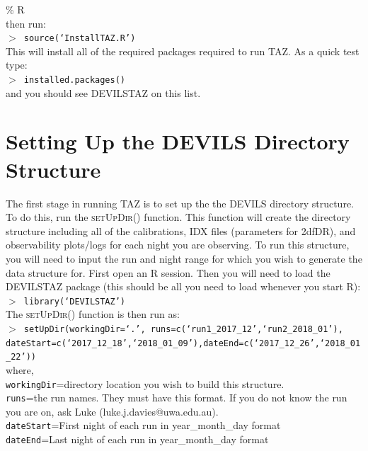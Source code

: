 \documentclass[12pt]{article}
\begin{document}
\hspace{10mm} \% R\\

then run:\\

\hspace{10mm}  \texttt{$>$ source(`InstallTAZ.R')}\\

This will install all of the required packages required to run \textsc{TAZ}. As a quick test type:\\

\hspace{10mm}  \texttt{$>$ installed.packages()}\\

and you should see DEVILSTAZ on this list.

\section{Setting Up the DEVILS Directory Structure}

The first stage in running \textsc{TAZ} is to set up the the DEVILS directory structure. To do this, run the \textsc{setUpDir()} function. This function will create the directory structure including all of the calibrations, IDX files (parameters for 2dfDR), and observability plots/logs for each night you are observing.  To run this structure, you will need to input the run and night range for which you wish to generate the data structure for. First open an R session. Then you will need to load the \textsc{DEVILSTAZ} package (this should be all you need to load whenever you start R):\\

\hspace{10mm}  \texttt{$>$ library(`DEVILSTAZ')}\\

The \textsc{setUpDir()}  function is then run as:\\

\hspace{10mm}  \texttt{$>$ setUpDir(workingDir=`.', runs=c(`run1\_2017\_12',`run2\_2018\_01'), \\ dateStart=c(`2017\_12\_18',`2018\_01\_09'),dateEnd=c(`2017\_12\_26',`2018\_01\_22')) }\\


where, \\

 \texttt{workingDir}=directory location you wish to build this structure.\\
 \texttt{runs}=the run names. They must have this format. If you do not know the run you are on, ask Luke (luke.j.davies@uwa.edu.au).\\
 \texttt{dateStart}=First night of each run in year\_month\_day format\\
 \texttt{dateEnd}=Last night of each run in year\_month\_day format\\
\end{document}
